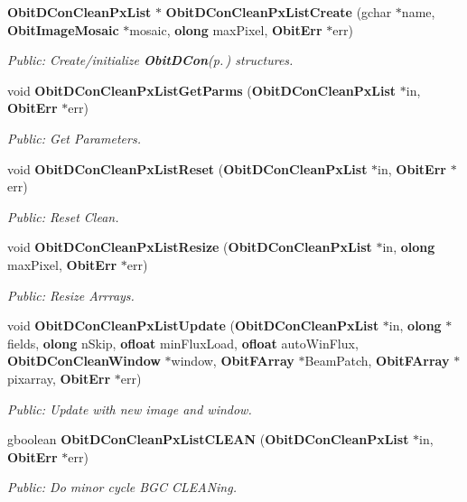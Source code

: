\begin{CompactItemize}
{\bf Obit\-DCon\-Clean\-Px\-List} $\ast$ {\bf Obit\-DCon\-Clean\-Px\-List\-Create} (gchar $\ast$name, {\bf Obit\-Image\-Mosaic} $\ast$mosaic, {\bf olong} max\-Pixel, {\bf Obit\-Err} $\ast$err)
\begin{CompactList}\small\item\em Public: Create/initialize {\bf Obit\-DCon}{\rm (p.\,\pageref{structObitDCon})} structures. \item\end{CompactList}\item 
void {\bf Obit\-DCon\-Clean\-Px\-List\-Get\-Parms} ({\bf Obit\-DCon\-Clean\-Px\-List} $\ast$in, {\bf Obit\-Err} $\ast$err)
\begin{CompactList}\small\item\em Public: Get Parameters. \item\end{CompactList}\item 
void {\bf Obit\-DCon\-Clean\-Px\-List\-Reset} ({\bf Obit\-DCon\-Clean\-Px\-List} $\ast$in, {\bf Obit\-Err} $\ast$err)
\begin{CompactList}\small\item\em Public: Reset Clean. \item\end{CompactList}\item 
void {\bf Obit\-DCon\-Clean\-Px\-List\-Resize} ({\bf Obit\-DCon\-Clean\-Px\-List} $\ast$in, {\bf olong} max\-Pixel, {\bf Obit\-Err} $\ast$err)
\begin{CompactList}\small\item\em Public: Resize Arrrays. \item\end{CompactList}\item 
void {\bf Obit\-DCon\-Clean\-Px\-List\-Update} ({\bf Obit\-DCon\-Clean\-Px\-List} $\ast$in, {\bf olong} $\ast$fields, {\bf olong} n\-Skip, {\bf ofloat} min\-Flux\-Load, {\bf ofloat} auto\-Win\-Flux, {\bf Obit\-DCon\-Clean\-Window} $\ast$window, {\bf Obit\-FArray} $\ast$Beam\-Patch, {\bf Obit\-FArray} $\ast$pixarray, {\bf Obit\-Err} $\ast$err)
\begin{CompactList}\small\item\em Public: Update with new image and window. \item\end{CompactList}\item 
gboolean {\bf Obit\-DCon\-Clean\-Px\-List\-CLEAN} ({\bf Obit\-DCon\-Clean\-Px\-List} $\ast$in, {\bf Obit\-Err} $\ast$err)
\begin{CompactList}\small\item\em Public: Do minor cycle BGC CLEANing. \item\end{CompactList}\item 

\end{CompactItemize}
